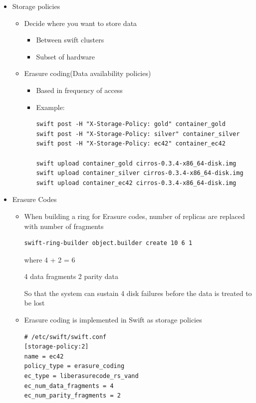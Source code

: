 \documentclass{article}
\begin{document}
\begin{itemize}
\item Storage policies
\begin{itemize}
\item Decide where you want to store data
\begin{itemize}
\item Between swift clusters
\item Subset of hardware
\end{itemize}
\item Erasure coding(Data availability policies)
\begin{itemize}
\item Based in frequency of access
\item Example:
\begin{verbatim}
swift post -H "X-Storage-Policy: gold" container_gold
swift post -H "X-Storage-Policy: silver" container_silver
swift post -H "X-Storage-Policy: ec42" container_ec42

swift upload container_gold cirros-0.3.4-x86_64-disk.img
swift upload container_silver cirros-0.3.4-x86_64-disk.img
swift upload container_ec42 cirros-0.3.4-x86_64-disk.img
\end{verbatim}
\end{itemize}
\end{itemize}

\item Erasure Codes
\begin{itemize}
\item When building a ring for Erasure codes, number of replicas are
replaced with number of fragments

\begin{verbatim}
swift-ring-builder object.builder create 10 6 1
\end{verbatim}

where 4 + 2 = 6

4 data fragments
2 parity data

So that the system can sustain 4 disk failures before the data is
treated to be lost

\item Erasure coding is implemented in Swift as storage policies

\begin{verbatim}
# /etc/swift/swift.conf
[storage-policy:2]
name = ec42
policy_type = erasure_coding
ec_type = liberasurecode_rs_vand
ec_num_data_fragments = 4
ec_num_parity_fragments = 2
\end{verbatim}


\end{itemize}
\end{itemize}
\end{document}
